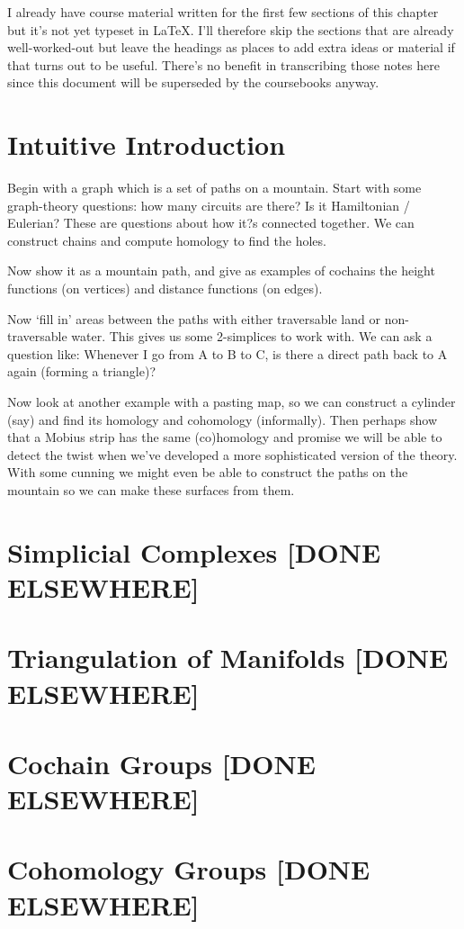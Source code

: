 \documentclass[oneside,english]{amsbook}
\numberwithin{section}{chapter}
\theoremstyle{plain}
\theoremstyle{definition}
\begin{document}
	I already have course material written for the first few sections of this chapter but it's not yet typeset in \LaTeX. I'll therefore skip the sections that are already well-worked-out but leave the headings as places to add extra ideas or material if that turns out to be useful. There's no benefit in transcribing those notes here since this document will be superseded by the coursebooks anyway. 


	\section{Intuitive Introduction}
		Begin with a graph which is a set of paths on a mountain. Start with some graph-theory questions: how many circuits are there? Is it Hamiltonian / Eulerian? These are questions about how it?s connected together. We can construct chains and compute homology to find the holes.
		
		Now show it as a mountain path, and give as examples of cochains the height functions (on vertices) and distance functions (on edges).
		
		Now `fill in' areas between the paths with either traversable land or non-traversable water. This gives us some 2-simplices to work with. We can ask a question like: Whenever I go from A to B to C, is there a direct path back to A again (forming a triangle)?
		
		Now look at another example with a pasting map, so we can construct a cylinder (say) and find its homology and cohomology (informally). Then perhaps show that a M\:obius strip has the same (co)homology and promise we will be able to detect the twist when we've developed a more sophisticated version of the theory. With some cunning we might even be able to construct the paths on the mountain so we can make these surfaces from them.

	\section{Simplicial Complexes [DONE ELSEWHERE]}
	\section{Triangulation of Manifolds [DONE ELSEWHERE]}
	\section{Cochain Groups [DONE ELSEWHERE]}
	\section{Cohomology Groups [DONE ELSEWHERE]}
\end{document}
